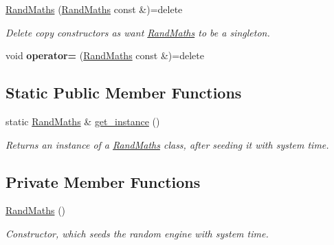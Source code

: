 \textbf{ }\par
\begin{DoxyCompactItemize}
\item 
\hyperlink{classretrocombinator_1_1RandMaths_aca899b8322519172fe008e0697c432db}{Rand\+Maths} (\hyperlink{classretrocombinator_1_1RandMaths}{Rand\+Maths} const \&)=delete
\begin{DoxyCompactList}\small\item\em Delete copy constructors as want \hyperlink{classretrocombinator_1_1RandMaths}{Rand\+Maths} to be a singleton. \end{DoxyCompactList}\item 
\mbox{\label{classretrocombinator_1_1RandMaths_a2ba731d3f29d3024da9df7e62f01f1bb}} 
void {\bfseries operator=} (\hyperlink{classretrocombinator_1_1RandMaths}{Rand\+Maths} const \&)=delete
\end{DoxyCompactItemize}

\subsection*{Static Public Member Functions}
\begin{DoxyCompactItemize}
\item 
static \hyperlink{classretrocombinator_1_1RandMaths}{Rand\+Maths} \& \hyperlink{classretrocombinator_1_1RandMaths_ae54dee1a16fb0e275e1624ccaa7dc87e}{get\+\_\+instance} ()
\begin{DoxyCompactList}\small\item\em Returns an instance of a \hyperlink{classretrocombinator_1_1RandMaths}{Rand\+Maths} class, after seeding it with system time. \end{DoxyCompactList}\end{DoxyCompactItemize}
\subsection*{Private Member Functions}
\begin{DoxyCompactItemize}
\item 
\hyperlink{classretrocombinator_1_1RandMaths_aa507e7465f9a650d560aa42c7f75310f}{Rand\+Maths} ()
\begin{DoxyCompactList}\small\item\em Constructor, which seeds the random engine with system time. \end{DoxyCompactList}\end{DoxyCompactItemize}
